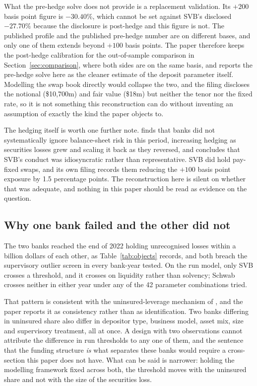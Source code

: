 What the pre-hedge solve does not provide is a replacement validation. Its $+200$
basis point figure is $-30.40\%$, which cannot be set against SVB's disclosed
$-27.70\%$ because the disclosure is post-hedge and this figure is not. The published
profile and the published pre-hedge number are on different bases, and only one of
them extends beyond $+100$ basis points. The paper therefore keeps the post-hedge
calibration for the out-of-sample comparison in Section~\ref{sec:comparison}, where
both sides are on the same basis, and reports the pre-hedge solve here as the cleaner
estimate of the deposit parameter itself. Modelling the swap book directly would
collapse the two, and the filing discloses the notional (\$10,700m) and fair value
(\$18m) but neither the tenor nor the fixed rate, so it is not something this
reconstruction can do without inventing an assumption of exactly the kind the paper
objects to.

The hedging itself is worth one further note. \citet{Kim2024} finds that banks did not
systematically ignore balance-sheet risk in this period, increasing hedging as
securities losses grew and scaling it back as they reversed, and concludes that SVB's
conduct was idiosyncratic rather than representative. SVB did hold pay-fixed swaps,
and its own filing records them reducing the $+100$ basis point exposure by 1.5
percentage points. The reconstruction here is silent on whether that was adequate,
and nothing in this paper should be read as evidence on the question.

\subsection{Why one bank failed and the other did not}

The two banks reached the end of 2022 holding unrecognised losses within a billion
dollars of each other, as Table~\ref{tab:objects} records, and both breach the
supervisory outlier screen in every bank-year tested. On the run model, only SVB
crosses a threshold, and it crosses on liquidity rather than solvency; Schwab crosses
neither in either year under any of the 42 parameter combinations tried.

That pattern is consistent with the uninsured-leverage mechanism of
\citet{Jiang2024}, and the paper reports it as consistency rather than as
identification. Two banks differing in uninsured share also differ in depositor type,
business model, asset mix, size and supervisory treatment, all at once. A design with
two observations cannot attribute the difference in run thresholds to any one of
them, and the sentence that the funding structure \emph{is} what separates these
banks would require a cross-section this paper does not have. What can be said is
narrower: holding the modelling framework fixed across both, the threshold moves with
the uninsured share and not with the size of the securities loss.

